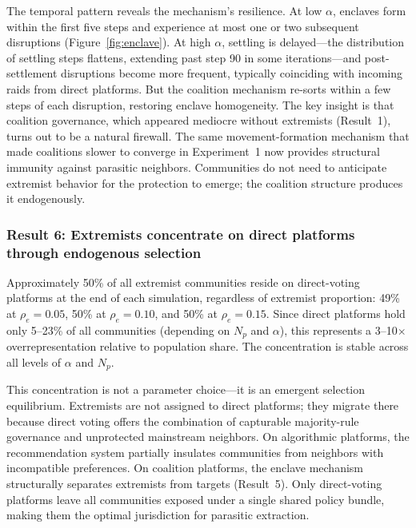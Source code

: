 
The temporal pattern reveals the mechanism's resilience. At low $\alpha$, enclaves form within the first five steps and experience at most one or two subsequent disruptions (Figure~\ref{fig:enclave}). At high $\alpha$, settling is delayed---the distribution of settling steps flattens, extending past step 90 in some iterations---and post-settlement disruptions become more frequent, typically coinciding with incoming raids from direct platforms. But the coalition mechanism re-sorts within a few steps of each disruption, restoring enclave homogeneity. The key insight is that coalition governance, which appeared mediocre without extremists (Result~1), turns out to be a natural firewall. The same movement-formation mechanism that made coalitions slower to converge in Experiment~1 now provides structural immunity against parasitic neighbors. Communities do not need to anticipate extremist behavior for the protection to emerge; the coalition structure produces it endogenously.

\subsubsection{Result 6: Extremists concentrate on direct platforms through endogenous selection}

Approximately 50\% of all extremist communities reside on direct-voting platforms at the end of each simulation, regardless of extremist proportion: 49\% at $\rho_e = 0.05$, 50\% at $\rho_e = 0.10$, and 50\% at $\rho_e = 0.15$. Since direct platforms hold only 5--23\% of all communities (depending on $N_p$ and $\alpha$), this represents a 3--10$\times$ overrepresentation relative to population share. The concentration is stable across all levels of $\alpha$ and $N_p$.

This concentration is not a parameter choice---it is an emergent selection equilibrium. Extremists are not assigned to direct platforms; they migrate there because direct voting offers the combination of capturable majority-rule governance and unprotected mainstream neighbors. On algorithmic platforms, the recommendation system partially insulates communities from neighbors with incompatible preferences. On coalition platforms, the enclave mechanism structurally separates extremists from targets (Result~5). Only direct-voting platforms leave all communities exposed under a single shared policy bundle, making them the optimal jurisdiction for parasitic extraction.

